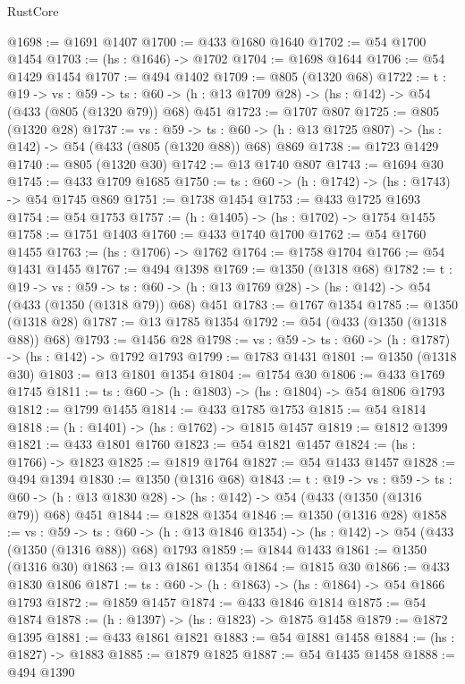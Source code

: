 \begin{lexlean}{RustCore}
\begin{coremodule}
@1698 := @1691 @1407
@1700 := @433 @1680 @1640
@1702 := @54 @1700 @1454
@1703 := (hs : @1646) -> @1702
@1704 := @1698 @1644
@1706 := @54 @1429 @1454
@1707 := @494 @1402
@1709 := @805 (@1320 @68)
@1722 := {t : @19} ->
  {vs : @59} ->
  {ts : @60} -> (h : @13 @1709 @28) -> (hs : @142) -> @54 (@433 (@805 (@1320 @79)) @68) @451
@1723 := @1707 @807
@1725 := @805 (@1320 @28)
@1737 := {vs : @59} ->
  {ts : @60} -> (h : @13 @1725 @807) -> (hs : @142) -> @54 (@433 (@805 (@1320 @88)) @68) @869
@1738 := @1723 @1429
@1740 := @805 (@1320 @30)
@1742 := @13 @1740 @807
@1743 := @1694 @30
@1745 := @433 @1709 @1685
@1750 := {ts : @60} -> (h : @1742) -> (hs : @1743) -> @54 @1745 @869
@1751 := @1738 @1454
@1753 := @433 @1725 @1693
@1754 := @54 @1753
@1757 := (h : @1405) -> (hs : @1702) -> @1754 @1455
@1758 := @1751 @1403
@1760 := @433 @1740 @1700
@1762 := @54 @1760 @1455
@1763 := (hs : @1706) -> @1762
@1764 := @1758 @1704
@1766 := @54 @1431 @1455
@1767 := @494 @1398
@1769 := @1350 (@1318 @68)
@1782 := {t : @19} ->
  {vs : @59} ->
  {ts : @60} -> (h : @13 @1769 @28) -> (hs : @142) -> @54 (@433 (@1350 (@1318 @79)) @68) @451
@1783 := @1767 @1354
@1785 := @1350 (@1318 @28)
@1787 := @13 @1785 @1354
@1792 := @54 (@433 (@1350 (@1318 @88)) @68)
@1793 := @1456 @28
@1798 := {vs : @59} -> {ts : @60} -> (h : @1787) -> (hs : @142) -> @1792 @1793
@1799 := @1783 @1431
@1801 := @1350 (@1318 @30)
@1803 := @13 @1801 @1354
@1804 := @1754 @30
@1806 := @433 @1769 @1745
@1811 := {ts : @60} -> (h : @1803) -> (hs : @1804) -> @54 @1806 @1793
@1812 := @1799 @1455
@1814 := @433 @1785 @1753
@1815 := @54 @1814
@1818 := (h : @1401) -> (hs : @1762) -> @1815 @1457
@1819 := @1812 @1399
@1821 := @433 @1801 @1760
@1823 := @54 @1821 @1457
@1824 := (hs : @1766) -> @1823
@1825 := @1819 @1764
@1827 := @54 @1433 @1457
@1828 := @494 @1394
@1830 := @1350 (@1316 @68)
@1843 := {t : @19} ->
  {vs : @59} ->
  {ts : @60} -> (h : @13 @1830 @28) -> (hs : @142) -> @54 (@433 (@1350 (@1316 @79)) @68) @451
@1844 := @1828 @1354
@1846 := @1350 (@1316 @28)
@1858 := {vs : @59} ->
  {ts : @60} -> (h : @13 @1846 @1354) -> (hs : @142) -> @54 (@433 (@1350 (@1316 @88)) @68) @1793
@1859 := @1844 @1433
@1861 := @1350 (@1316 @30)
@1863 := @13 @1861 @1354
@1864 := @1815 @30
@1866 := @433 @1830 @1806
@1871 := {ts : @60} -> (h : @1863) -> (hs : @1864) -> @54 @1866 @1793
@1872 := @1859 @1457
@1874 := @433 @1846 @1814
@1875 := @54 @1874
@1878 := (h : @1397) -> (hs : @1823) -> @1875 @1458
@1879 := @1872 @1395
@1881 := @433 @1861 @1821
@1883 := @54 @1881 @1458
@1884 := (hs : @1827) -> @1883
@1885 := @1879 @1825
@1887 := @54 @1435 @1458
@1888 := @494 @1390

\end{coremodule}
\end{lexlean}
